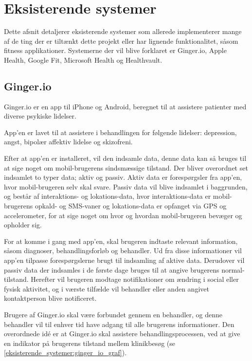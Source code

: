 \section{Eksisterende systemer}
Dette afsnit detaljerer eksisterende systemer som allerede implementerer mange af de ting der er tiltænkt dette projekt eller har lignende funktionalitet, såsom fitness applikationer. 
Systemerne der vil blive forklaret er Ginger.io, Apple Health, Google Fit, Microsoft Health og Healthvault.

\subsection{Ginger.io}
Ginger.io er en app til iPhone og Android, beregnet til at assistere patienter med diverse psykiske lidelser.\cite{ginger_dot_io}\cite{gingerio_mit}\cite{gingerio_dailymail}


App'en er lavet til at assistere i behandlingen for følgende lidelser: depression, angst, bipolær affektiv lidelse og skizofreni.

Efter at app'en er installeret, vil den indsamle data, denne data kan så bruges til at sige noget om mobil-brugerens sindsmæssige tilstand.
Der bliver overordnet set indsamlet to typer data; aktiv og passiv.
Aktiv data er forespørgsler fra app'en, hvor mobil-brugeren selv skal svare.
Passiv data vil blive indsamlet i baggrunden, og består af interaktions- og lokations-data, hvor interaktions-data er mobil-brugerens opkald- og SMS-vaner og lokations-data er opfanget via GPS og accelerometer, for at sige noget om hvor og hvordan mobil-brugeren bevæger og opholder sig.

For at komme i gang med app'en, skal brugeren indtaste relevant information, såsom diagnoser, behandlingsforløb og behandler.
Ud fra disse informationer vil app'en tilpasse forespørgslerne brugt til indsamling af aktive data.
Derudover vil passiv data der indsamles i de første dage bruges til at angive brugerens normal-tilstand.
Herefter vil brugeren modtage notifikationer om ændring i social eller fysisk aktivitet, og i værste tilfælde vil behandler eller anden angivet kontaktperson blive notificeret.

Brugere af Ginger.io skal være forbundet gennem en behandler, og denne behandler vil til enhver tid have adgang til alle brugerens informationer.
Den overordnede idé er at Ginger.io skal assistere behandlingsprocessen, ved at give en indikator på brugerens tilstand mellem klinikbesøg (se \cref{eksisterende_systemer:ginger_io_graf}).

